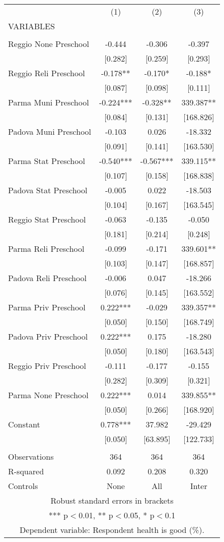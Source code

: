 \begin{tabular}{lccc} \hline
 & (1) & (2) & (3) \\
VARIABLES &  &  &  \\ \hline
 &  &  &  \\
Reggio None Preschool & -0.444 & -0.306 & -0.397 \\
 & [0.282] & [0.259] & [0.293] \\
Reggio Reli Preschool & -0.178** & -0.170* & -0.188* \\
 & [0.087] & [0.098] & [0.111] \\
Parma Muni Preschool & -0.224*** & -0.328** & 339.387** \\
 & [0.084] & [0.131] & [168.826] \\
Padova Muni Preschool & -0.103 & 0.026 & -18.332 \\
 & [0.091] & [0.141] & [163.530] \\
Parma Stat Preschool & -0.540*** & -0.567*** & 339.115** \\
 & [0.107] & [0.158] & [168.838] \\
Padova Stat Preschool & -0.005 & 0.022 & -18.503 \\
 & [0.104] & [0.167] & [163.545] \\
Reggio Stat Preschool & -0.063 & -0.135 & -0.050 \\
 & [0.181] & [0.214] & [0.248] \\
Parma Reli Preschool & -0.099 & -0.171 & 339.601** \\
 & [0.103] & [0.147] & [168.857] \\
Padova Reli Preschool & -0.006 & 0.047 & -18.266 \\
 & [0.076] & [0.145] & [163.552] \\
Parma Priv Preschool & 0.222*** & -0.029 & 339.357** \\
 & [0.050] & [0.150] & [168.749] \\
Padova Priv Preschool & 0.222*** & 0.175 & -18.280 \\
 & [0.050] & [0.180] & [163.543] \\
Reggio Priv Preschool & -0.111 & -0.177 & -0.155 \\
 & [0.282] & [0.309] & [0.321] \\
Parma None Preschool & 0.222*** & 0.014 & 339.855** \\
 & [0.050] & [0.266] & [168.920] \\
Constant & 0.778*** & 37.982 & -29.429 \\
 & [0.050] & [63.895] & [122.733] \\
 &  &  &  \\
Observations & 364 & 364 & 364 \\
R-squared & 0.092 & 0.208 & 0.320 \\
 Controls & None & All & Inter \\ \hline
\multicolumn{4}{c}{ Robust standard errors in brackets} \\
\multicolumn{4}{c}{ *** p$<$0.01, ** p$<$0.05, * p$<$0.1} \\
\multicolumn{4}{c}{ Dependent variable: Respondent health is good (\%).} \\
\end{tabular}
